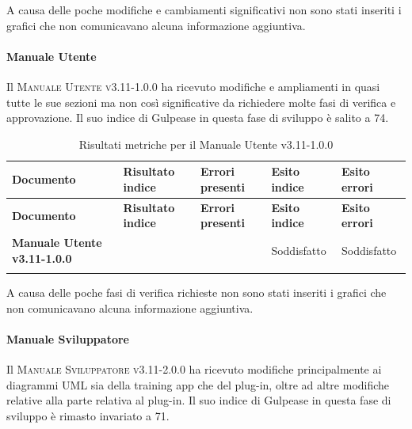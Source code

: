 A causa delle poche modifiche e cambiamenti significativi non sono stati inseriti i grafici che non comunicavano alcuna informazione aggiuntiva.

\paragraph{Manuale Utente}
\label{sub:glossario}
Il \textsc{Manuale Utente v3.11-1.0.0} ha ricevuto modifiche e ampliamenti in quasi tutte le sue sezioni ma non così significative da richiedere molte fasi di verifica e approvazione.
Il suo indice di Gulpease in questa fase di sviluppo è salito a 74.

\renewcommand{\arraystretch}{2} %
\begin{longtable}[H]{>{\centering\bfseries}m{6cm} >{\centering}m{2cm} >{\centering}m{2.5cm} >{\centering}m{2.5cm} >{\centering\arraybackslash}m{2.5cm}}  
  \rowcolor{lightgray}
  {\textbf{Documento}} & {\textbf{Risultato indice}} & {\textbf{Errori presenti}} & {\textbf{Esito indice}} & {\textbf{Esito errori}}  \\
  \endfirsthead%
  \rowcolor{lightgray}
  {\textbf{Documento}} & {\textbf{Risultato indice}} & {\textbf{Errori presenti}} & {\textbf{Esito indice}} & {\textbf{Esito errori}}  \\
  \endhead%
  \textbf{Manuale Utente v3.11-1.0.0} & 74               & 0               & Soddisfatto & Soddisfatto \\
  \caption{Risultati metriche per il Manuale Utente v3.11-1.0.0}
  \label{tab:my-table}
\end{longtable}

A causa delle poche fasi di verifica richieste non sono stati inseriti i grafici che non comunicavano alcuna informazione aggiuntiva.

\paragraph{Manuale Sviluppatore}
\label{sub:glossario}
Il \textsc{Manuale Sviluppatore v3.11-2.0.0} ha ricevuto modifiche principalmente ai diagrammi UML sia della training app che del plug-in, oltre ad altre modifiche relative alla parte relativa al plug-in.
Il suo indice di Gulpease in questa fase di sviluppo è rimasto invariato a 71.

